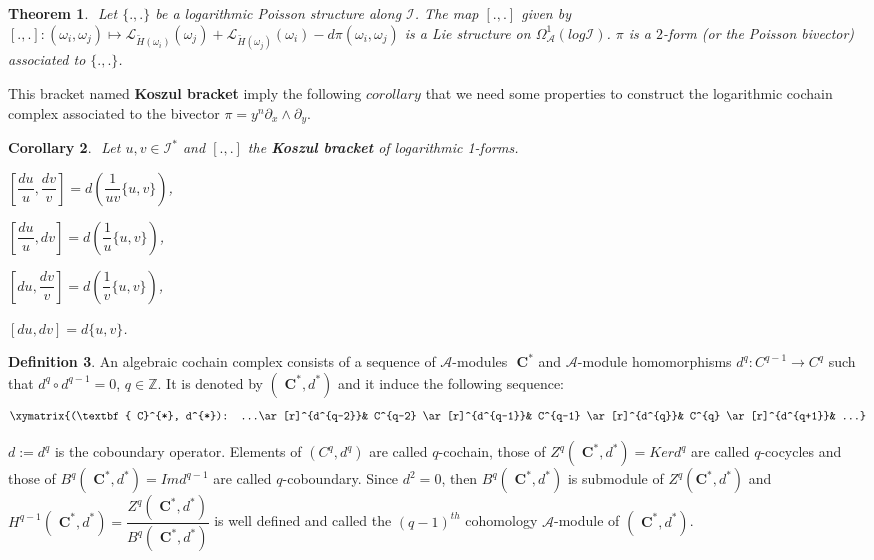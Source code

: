 \documentclass[a4paper, 12pt,oneside,reqno]{amsart}
\newtheorem{theorem}{Theorem}[section]
\newtheorem{corollary}[theorem]{Corollary}
\theoremstyle{definition}
\newtheorem{definition}[theorem]{Definition}
\begin{document}
\begin{theorem}  \cite{DJ1} $\label{T2}$
Let $\{.,.\}$ be a logarithmic Poisson structure along 
 $\mathcal{I}$.
 The map $[.,.]$ given by $[.,.]: (\omega_{i},\omega_{j})\mapsto \mathcal{L}_{\tilde{H}(\omega_{i})}(\omega_{j}) + \mathcal{L}_{\tilde{H}(\omega_{j})}(\omega_{i}) - d \pi (\omega_{i},\omega_{j})$ is a Lie structure on $\Omega^{1} _{\mathcal{A}}(log \mathcal{I})$. $\pi$ is a $2$-form (or the Poisson bivector) associated to  $\{.,.\}$.
 
\end{theorem}
This bracket named \textbf{Koszul bracket}  imply the  following $corollary$ that we need some properties
to construct the logarithmic cochain complex associated to the bivector $\pi = y^n\partial_{x}\wedge \partial_{y}$.
\begin{corollary} \cite{DJ1} $\label{Cor1} $
Let $u,v\in \mathcal{I}^{*}$ and $[.,.]$ the \textbf{Koszul bracket} of logarithmic 1-forms.
\item[a.] $[\dfrac{du}{u}, \dfrac{dv}{v}] = d(\dfrac{1}{uv}\{u,v\})$,
\item[b.] $[\dfrac{du}{u}, dv] = d(\dfrac{1}{u}\{u,v\})$,
\item[c.] $[du, \dfrac{dv}{v}] =d(\dfrac{1}{v}\{u,v\})$,
\item[d.] $[du, dv] =  d\{u,v\}$.
\end{corollary}

 \begin{definition} \cite{AJ}
 An algebraic cochain complex consists of a sequence of
 $\mathcal{A}$-modules $\textbf{ C}^{*}$ and $\mathcal{A}$-module
 homomorphisms $d^{q}: C^{q-1} \longrightarrow C^{q}$ such that
 $d^{q}\circ d^{q-1}=0$, $q\in \mathbb{Z}$. It is denoted by
 $(\textbf{ C}^{*}, d^{*})$ and it induce the following sequence:
 \[\xymatrix{(\textbf{ C}^{*}, d^{*}):  ...\ar[r]^{d^{q-2}}& C^{q-2} \ar[r]^{d^{q-1}}& C^{q-1}  \ar[r]^{d^{q}}& C^{q}   \ar[r]^{d^{q+1}}& ...}\]
 \end{definition}
 $d:=d^{q}$ is the coboundary operator. Elements of $(C^{q}, d^{q})$
 are called $q$-cochain, those of $Z^{q}(\textbf{ C}^{*}, d^{*})=Ker
 d^{q}$ are called $q$-cocycles and those of $B^{q}(\textbf{ C}^{*},
 d^{*})= Imd^{q-1}$ are called $q$-coboundary. Since $d^{2}=0$, then
 $B^{q}(\textbf{ C}^{*},  d^{*})$ is submodule of  $Z^{q}(\textbf{
 C}^{*}, d^{*})$ and $H^{q-1}(\textbf{ C}^{*}, d^{*})=
 \dfrac{Z^{q}(\textbf{ C}^{*}, d^{*})}{B^{q}(\textbf{ C}^{*},
 d^{*})}$ is well defined and called the $(q-1)^{th}$ cohomology
 $\mathcal{A}$-module of $(\textbf{ C}^{*}, d^{*})$.
 
\end{document}
